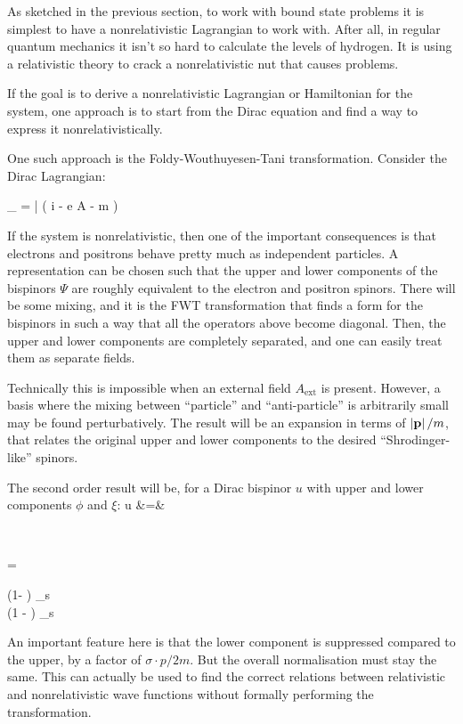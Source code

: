 As sketched in the previous section, to work with bound state problems it is simplest to have a nonrelativistic Lagrangian to work with.  After all, in regular quantum mechanics it isn't so hard to calculate the levels of hydrogen.  It is using a relativistic theory to crack a nonrelativistic nut that causes problems.

If the goal is to derive a nonrelativistic Lagrangian or Hamiltonian for the system, one approach is to start from the Dirac equation and find a way to express it nonrelativistically.

One such approach is the Foldy-Wouthuyesen-Tani transformation.  Consider the Dirac Lagrangian:

\beq
	_{} = 
		\bar{\Psi} \left( i \partial \cdot \gamma - e A \cdot \gamma - m \right) \Psi
\eeq 
		
If the system is nonrelativistic, then one of the important consequences is that electrons and positrons behave pretty much as independent particles.  A representation can be chosen such that the upper and lower components of the bispinors $\Psi$ are roughly equivalent to the electron and positron spinors.  There will be some mixing, and it is the FWT transformation that finds a form for the bispinors in such a way that all the operators above become diagonal.  Then, the upper and lower components are completely separated, and one can easily treat them as separate fields.

Technically this is impossible when an external field $A_{\text{ext}}$ is present.  However, a basis where the mixing between ``particle'' and ``anti-particle'' is arbitrarily small may be found perturbatively.  The result will be an expansion in terms of $\left| \mathbf{p} \right| / m$, that relates the original upper and lower components to the desired ``Shrodinger-like'' spinors.

The second order result will be, for a Dirac bispinor $u$ with upper and lower components $\phi$ and $\xi$:
\beqa
	u &=& \begin{pmatrix}\phi \\ \chi \end{pmatrix} = \begin{pmatrix} (1- ) \phi_s \\  (1 -  ) \phi_s \end{pmatrix}
\eeqa
An important feature here is that the lower component is suppressed compared to the upper, by a factor of $\sigma \cdot p / 2m$.  But the overall normalisation must stay the same.  This can actually be used to find the correct relations between relativistic and nonrelativistic wave functions without formally performing the transformation.  


